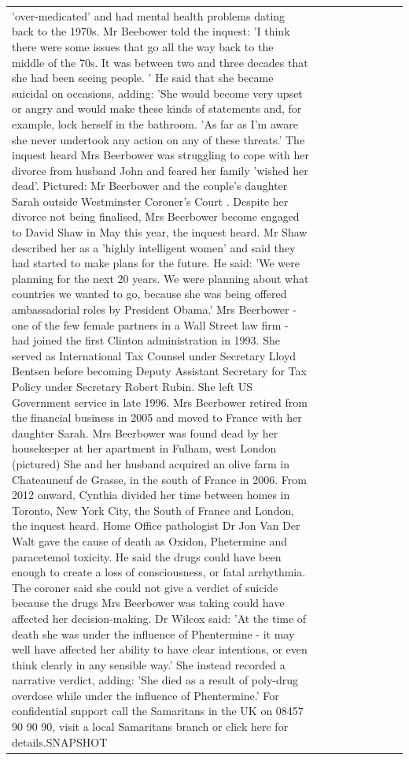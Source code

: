\begin{table}[H]
\begin{tabular}{lllrlllll}
'over-medicated' and had mental health problems dating back to the 1970s. Mr Beebower told the inquest: 'I think there were some issues that go all the way back to the middle of the 70s. It was between two and three decades that she had been seeing people. ' He said that she became suicidal on occasions, adding: 'She would become very upset or angry and would make these kinds of statements and, for example, lock herself in the bathroom. 'As far as I'm aware she never undertook any action on any of these threats.' The inquest heard Mrs Beerbower was struggling to cope with her divorce from husband John and feared her family 'wished her dead'. Pictured: Mr Beerbower and the couple's daughter Sarah outside Westminster Coroner's Court . Despite her divorce not being finalised, Mrs Beerbower become engaged to David Shaw in May this year, the inquest heard. Mr Shaw described her as a 'highly intelligent women' and said they had started to make plans for the future. He said: 'We were planning for the next 20 years. We were planning about what countries we wanted to go, because she was being offered ambassadorial roles by President Obama.' Mrs Beerbower - one of the few female partners in a Wall Street law firm - had joined the first Clinton administration in 1993. She served as International Tax Counsel under Secretary Lloyd Bentsen before becoming Deputy Assistant Secretary for Tax Policy under Secretary Robert Rubin. She left US Government service in late 1996. Mrs Beerbower retired from the financial business in 2005 and moved to France with her daughter Sarah. Mrs Beerbower was found dead by her housekeeper at her apartment in Fulham, west London (pictured) She and her husband acquired an olive farm in Chateauneuf de Grasse, in the south of France in 2006. From 2012 onward, Cynthia divided her time between homes in Toronto, New York City, the South of France and London, the inquest heard. Home Office pathologist Dr Jon Van Der Walt gave the cause of death as Oxidon, Phetermine and paracetemol toxicity. He said the drugs could have been enough to create a loss of consciousness, or fatal arrhythmia. The coroner said she could not give a verdict of suicide because the drugs Mrs Beerbower was taking could have affected her decision-making. Dr Wilcox said: 'At the time of death she was under the influence of Phentermine - it may well have affected her ability to have clear intentions, or even think clearly in any sensible way.' She instead recorded a narrative verdict, adding: 'She died as a result of poly-drug overdose while under the influence of Phentermine.' For confidential support call the Samaritans in the UK on 08457 90 90 90, visit a local Samaritans branch or click here for details.SNAPSHOT \\

\end{tabular}
\end{table}
